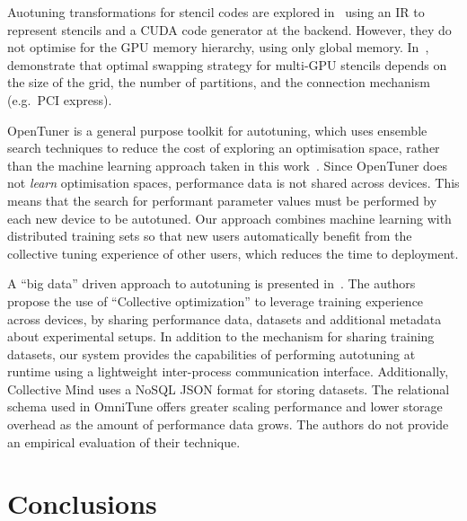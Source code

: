 \documentclass[nonatbib,preprint,9pt]{sigplanconf}
\begin{document}
Auotuning transformations for stencil codes are explored
in~\cite{Kamil2010} using an IR to represent stencils and a CUDA code
generator at the backend. However, they do not optimise for the GPU
memory hierarchy, using only global memory. In~\cite{Lutz2013},
\citeauthor{Lutz2013} demonstrate that optimal swapping strategy for
multi-GPU stencils depends on the size of the grid, the number of
partitions, and the connection mechanism (e.g.\ PCI express).

OpenTuner is a general purpose toolkit for autotuning, which uses
ensemble search techniques to reduce the cost of exploring an
optimisation space, rather than the machine learning approach taken in
this work~\cite{Ansel2013}. Since OpenTuner does not \emph{learn}
optimisation spaces, performance data is not shared across
devices. This means that the search for performant parameter values
must be performed by each new device to be autotuned. Our approach
combines machine learning with distributed training sets so that new
users automatically benefit from the collective tuning experience of
other users, which reduces the time to deployment.

A ``big data'' driven approach to autotuning is presented
in~\cite{Fursin2014}. The authors propose the use of ``Collective
optimization'' to leverage training experience across devices, by
sharing performance data, datasets and additional metadata about
experimental setups. In addition to the mechanism for sharing training
datasets, our system provides the capabilities of performing
autotuning at runtime using a lightweight inter-process communication
interface. Additionally, Collective Mind uses a NoSQL JSON format for
storing datasets. The relational schema used in OmniTune offers
greater scaling performance and lower storage overhead as the amount
of performance data grows. The authors do not provide an empirical
evaluation of their technique.


\section{Conclusions}\label{sec:conclusions}
\end{document}
